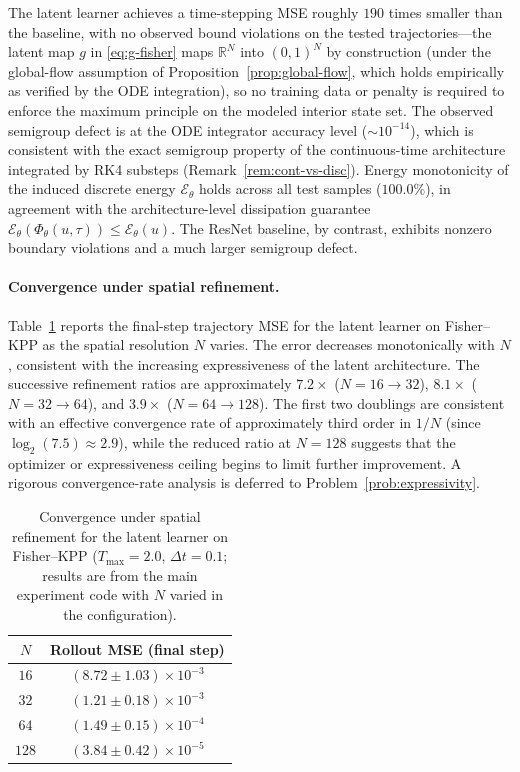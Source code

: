 \documentclass[11pt]{article}
\newcommand{\cE}{\mathcal{E}}
\begin{document}
The latent learner achieves a time-stepping MSE roughly $190$ times smaller than the baseline, with no observed bound violations on the tested trajectories---the latent map $g$ in \eqref{eq:g-fisher} maps $\mathbb{R}^N$ into $(0,1)^N$ by construction (under the global-flow assumption of Proposition~\ref{prop:global-flow}, which holds empirically as verified by the ODE integration), so no training data or penalty is required to enforce the maximum principle on the modeled interior state set. The observed semigroup defect is at the ODE integrator accuracy level ($\sim10^{-14}$), which is consistent with the exact semigroup property of the continuous-time architecture integrated by RK4 substeps (Remark~\ref{rem:cont-vs-disc}). Energy monotonicity of the induced discrete energy $\cE_{\theta}$ holds across all test samples ($100.0\%$), in agreement with the architecture-level dissipation guarantee $\cE_\theta(\Phi_\theta(u,\tau))\le\cE_\theta(u)$. The ResNet baseline, by contrast, exhibits nonzero boundary violations and a much larger semigroup defect.

\paragraph{Convergence under spatial refinement.}
Table~\ref{tab:convergence-N} reports the final-step trajectory MSE for the latent learner on Fisher--KPP as the spatial resolution $N$ varies. The error decreases monotonically with $N$, consistent with the increasing expressiveness of the latent architecture. The successive refinement ratios are approximately $7.2\times$ ($N{=}16{\to}32$), $8.1\times$ ($N{=}32{\to}64$), and $3.9\times$ ($N{=}64{\to}128$). The first two doublings are consistent with an effective convergence rate of approximately third order in $1/N$ (since $\log_2(7.5)\approx 2.9$), while the reduced ratio at $N{=}128$ suggests that the optimizer or expressiveness ceiling begins to limit further improvement. A rigorous convergence-rate analysis is deferred to Problem~\ref{prob:expressivity}.

\begin{table}[htbp]
\centering
\caption{Convergence under spatial refinement for the latent learner on Fisher--KPP ($T_{\max}=2.0$, $\Delta t=0.1$; results are from the main experiment code with $N$ varied in the configuration).}
\label{tab:convergence-N}
\begin{tabular}{cc}
\hline
$N$ & Rollout MSE (final step) \\
\hline
$16$ & $(8.72\pm 1.03)\times10^{-3}$ \\
$32$ & $(1.21\pm 0.18)\times10^{-3}$ \\
$64$ & $(1.49\pm 0.15)\times10^{-4}$ \\
$128$ & $(3.84\pm 0.42)\times10^{-5}$ \\
\hline
\end{tabular}
\end{table}
\end{document}
